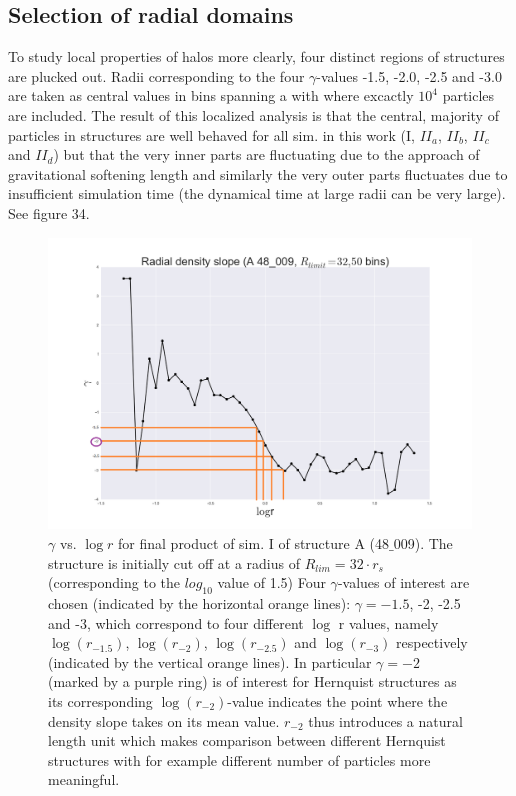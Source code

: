 \subsection{Selection of radial domains}
To study local properties of halos more clearly, four distinct regions of structures are plucked out. Radii corresponding to the four $\gamma$-values -1.5, -2.0, -2.5 and -3.0 are taken as central values in bins spanning a with where excactly $10^4$ particles are included. The result of this localized analysis is that the central, majority of particles in structures are well behaved for all sim. in this work (I, $II_a$, $II_b$, $II_c$ and $II_d$) but that the very inner parts are fluctuating due to the approach of gravitational softening length and similarly the very outer parts fluctuates due to insufficient simulation time (the dynamical time at large radii can be very large). See figure 34.


\begin{figure}[!htbp]
\centering
\includegraphics[width=1.0\linewidth]{img/A_48_009_gamma_logr_I_R32.png}
\caption{$\gamma$ vs. $\log r$ for final product of sim. I of structure A (48$\_$009).
The structure is initially cut off at a radius of $R_{lim} = 32\cdot r_s$ (corresponding to the $log_{10}$ value of 1.5) 
Four $\gamma$-values of interest are chosen (indicated by the horizontal orange lines):
$\gamma = -1.5$, -2, -2.5 and -3,
which correspond to four different $\log$ r values, namely
$\log (r_{-1.5})$, $\log (r_{-2})$, $\log (r_{-2.5})$ and $\log (r_{-3})$ respectively (indicated by the vertical orange lines).
In particular $\gamma = -2$ (marked by a purple ring) is of interest for Hernquist structures as its corresponding $\log (r_{-2})$-value indicates the point where the density slope takes on its mean value.
$r_{-2}$ thus introduces a natural length unit which makes comparison between different Hernquist structures with for example different number of particles more meaningful.}
\label{fig:test}
\end{figure}


